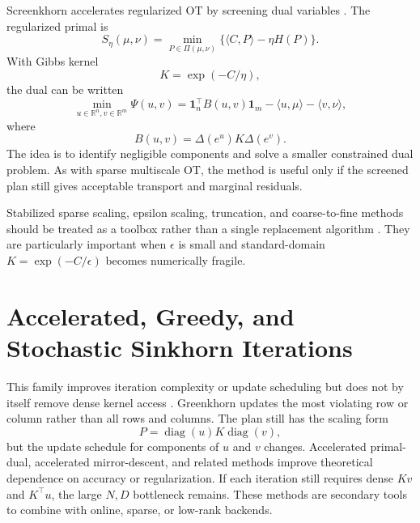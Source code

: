 \documentclass[11pt]{article}
\newcommand{\R}{\mathbb{R}}
\newcommand{\ones}{\mathbf{1}}
\newcommand{\diag}{\operatorname{diag}}
\begin{document}
Screenkhorn accelerates regularized OT by screening dual variables
\citep{alaya2019screenkhorn}.  The
regularized primal is
\begin{equation}
S_\eta(\mu,\nu)
=
\min_{P\in\Pi(\mu,\nu)}
\{\langle C,P\rangle-\eta H(P)\}.
\label{eq:screenkhorn-primal}
\end{equation}
With Gibbs kernel
\begin{equation}
K=\exp(-C/\eta),
\label{eq:screenkhorn-kernel}
\end{equation}
the dual can be written
\begin{equation}
\min_{u\in\R^n,v\in\R^m}
\Psi(u,v)
=
\ones_n^\top B(u,v)\ones_m
-\langle u,\mu\rangle
-\langle v,\nu\rangle,
\label{eq:screenkhorn-dual}
\end{equation}
where
\begin{equation}
B(u,v)
=
\Delta(e^u)K\Delta(e^v).
\label{eq:screenkhorn-B}
\end{equation}
The idea is to identify negligible components and solve a smaller constrained
dual problem.  As with sparse multiscale OT, the method is useful only if the
screened plan still gives acceptable transport and marginal residuals.

Stabilized sparse scaling, epsilon scaling, truncation, and coarse-to-fine
methods should be treated as a toolbox rather than a single replacement
algorithm \citep{schmitzer2019stabilized}.  They are particularly important
when $\epsilon$ is small and standard-domain $K=\exp(-C/\epsilon)$ becomes
numerically fragile.

\section{Accelerated, Greedy, and Stochastic Sinkhorn Iterations}

This family improves iteration complexity or update scheduling but does not by
itself remove dense kernel access
\citep{altschuler2017nearlinear,dvurechensky2018computational,abid2018greedy,lin2019efficient,xu2026accelerating}.
Greenkhorn updates the most violating row or column rather than all rows and
columns.  The plan still has the scaling
form
\begin{equation}
P=\diag(u)K\diag(v),
\label{eq:greenkhorn-plan}
\end{equation}
but the update schedule for components of $u$ and $v$ changes.  Accelerated
primal-dual, accelerated mirror-descent, and related methods improve
theoretical dependence on accuracy or regularization.  If each iteration still
requires dense $Kv$ and $K^\top u$, the large $N,D$ bottleneck remains.  These
methods are secondary tools to combine with online, sparse, or low-rank
backends.
\end{document}
